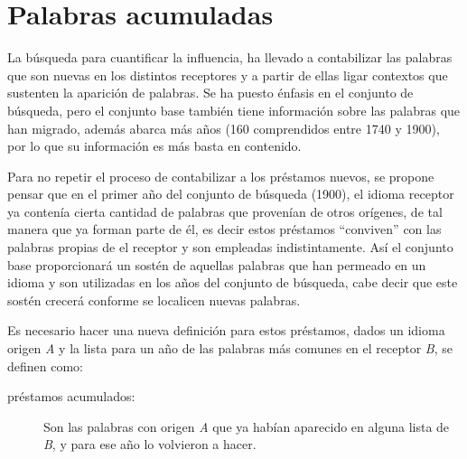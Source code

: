 \chapter{Palabras acumuladas}
La búsqueda para cuantificar la influencia, ha llevado a contabilizar las
palabras que son nuevas en los distintos receptores y a partir de ellas ligar
contextos que sustenten la aparición de palabras.  Se ha puesto énfasis en el
conjunto de búsqueda, pero  el conjunto base  también tiene información sobre
las palabras que han migrado, además  abarca más años (160 comprendidos entre
1740 y 1900), por lo que su información es más basta en contenido. 

Para no repetir el proceso de contabilizar a los préstamos nuevos,  se propone
pensar que en el primer año del conjunto de búsqueda (1900),  el idioma
receptor ya contenía cierta cantidad de palabras que provenían de otros
orígenes,  de tal manera que ya forman parte de él, es decir estos préstamos
``conviven'' con las palabras propias de el receptor y son empleadas
indistintamente. Así el conjunto
base proporcionará un sostén de aquellas palabras que han permeado en un idioma
y son utilizadas en los años del conjunto de búsqueda,  cabe decir que este
sostén crecerá conforme se localicen nuevas palabras. 

Es necesario hacer una nueva definición para estos préstamos, dados un idioma  origen  \textit{A} y la lista para un año  de las palabras más comunes en el receptor \textit{B}, se definen como: 

\begin{description}
	\item[préstamos acumulados:] Son las palabras con origen \textit{A} que ya habían aparecido en alguna lista de \textit{B}, y para ese año lo volvieron a hacer.  
\end{description}


